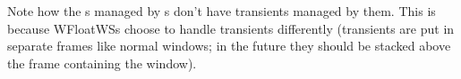 Note how the s managed by s don't have
transients managed by them. This is because WFloatWSs choose to handle
transients differently (transients are put in separate frames like normal
windows; in the future they should be stacked above the frame containing the
 window).
